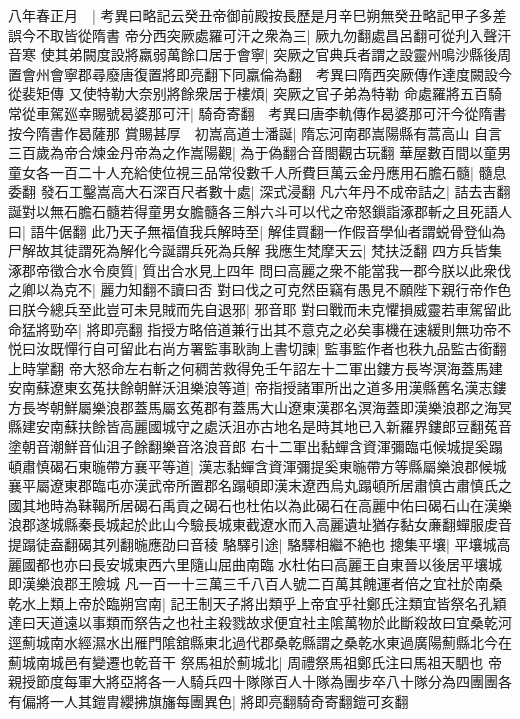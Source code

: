 八年春正月　|{
	考異曰略記云癸丑帝御前殿按長歷是月辛巳朔無癸丑略記甲子多差誤今不取皆從隋書}
帝分西突厥處羅可汗之衆為三|{
	厥九勿翻處昌呂翻可從刋入聲汗音寒}
使其弟闕度設將羸弱萬餘口居于會寧|{
	突厥之官典兵者謂之設靈州鳴沙縣後周置會州會寧郡尋廢唐復置將即亮翻下同羸倫為翻　考異曰隋西突厥傳作達度闕設今從裴矩傳}
又使特勒大奈别將餘衆居于樓煩|{
	突厥之官子弟為特勒}
命處羅將五百騎常從車駕廵幸賜號曷婆那可汗|{
	騎奇寄翻　考異曰唐李軌傳作曷婆那可汗今從隋書按今隋書作曷薩那}
賞賜甚厚　初嵩高道士潘誕|{
	隋忘河南郡嵩陽縣有蒿高山}
自言三百歲為帝合煉金丹帝為之作嵩陽觀|{
	為于偽翻合音閤觀古玩翻}
華屋數百間以童男童女各一百二十人充給使位視三品常役數千人所費巨萬云金丹應用石膽石髓|{
	髓息委翻}
發石工鑿嵩高大石深百尺者數十處|{
	深式浸翻}
凡六年丹不成帝詰之|{
	詰去吉翻}
誕對以無石膽石髓若得童男女膽髓各三斛六斗可以代之帝怒鎻詣涿郡斬之且死語人曰|{
	語牛倨翻}
此乃天子無福值我兵解時至|{
	解佳買翻一作假音學仙者謂蜕骨登仙為尸解故其徒謂死為解化今誕謂兵死為兵解}
我應生梵摩天云|{
	梵扶泛翻}
四方兵皆集涿郡帝徵合水令庾質|{
	質出合水見上四年}
問曰高麗之衆不能當我一郡今朕以此衆伐之卿以為克不|{
	麗力知翻不讀曰否}
對曰伐之可克然臣竊有愚見不願陛下親行帝作色曰朕今總兵至此豈可未見賊而先自退邪|{
	邪音耶}
對曰戰而未克懼損威靈若車駕留此命猛將勁卒|{
	將即亮翻}
指授方略倍道兼行出其不意克之必矣事機在速緩則無功帝不悦曰汝既憚行自可留此右尚方署監事耿詢上書切諫|{
	監事監作者也秩九品監古銜翻上時掌翻}
帝大怒命左右斬之何稠苦救得免壬午詔左十二軍出鏤方長岑溟海蓋馬建安南蘇遼東玄菟扶餘朝鮮沃沮樂浪等道|{
	帝指授諸軍所出之道多用漢縣舊名漢志鏤方長岑朝鮮屬樂浪郡蓋馬屬玄菟郡有蓋馬大山遼東漢郡名溟海蓋即漢樂浪郡之海冥縣建安南蘇扶餘皆高麗國城守之處沃沮亦古地名是時其地已入新羅界鏤郎豆翻菟音塗朝音潮鮮音仙沮子餘翻樂音洛浪音郎}
右十二軍出黏蟬含資渾彌臨屯候城提奚蹋頓肅慎碣石東暆帶方襄平等道|{
	漢志黏蟬含資渾彌提奚東暆帶方等縣屬樂浪郡候城襄平屬遼東郡臨屯亦漢武帝所置郡名蹋頓即漢末遼西烏丸蹋頓所居肅慎古肅慎氏之國其地時為靺鞨所居碣石禹貢之碣石也杜佑以為此碣石在高麗中佑曰碣石山在漢樂浪郡遂城縣秦長城起於此山今驗長城東截遼水而入高麗遺址猶存黏女亷翻蟬服䖍音提蹋徒盍翻碣其列翻暆應劭曰音稜}
駱驛引途|{
	駱驛相繼不絶也}
摠集平壤|{
	平壤城高麗國都也亦曰長安城東西六里隨山屈曲南臨水杜佑曰高麗王自東晉以後居平壤城即漢樂浪郡王險城}
凡一百一十三萬三千八百人號二百萬其餽運者倍之宜社於南桑乾水上類上帝於臨朔宫南|{
	記王制天子將出類乎上帝宜乎社鄭氏注類宜皆祭名孔穎達曰天道遠以事類而祭告之也社主殺戮故求便宜社主隂萬物於此斷殺故曰宜桑乾河逕薊城南水經濕水出雁門隂舘縣東北過代郡桑乾縣謂之桑乾水東過廣陽薊縣北今在薊城南城邑有變遷也乾音干}
祭馬祖於薊城北|{
	周禮祭馬祖鄭氏注曰馬祖天駟也}
帝親授節度每軍大將亞將各一人騎兵四十隊隊百人十隊為團步卒八十隊分為四團團各有偏將一人其鎧胄纓拂旗旛每團異色|{
	將即亮翻騎奇寄翻鎧可亥翻}
